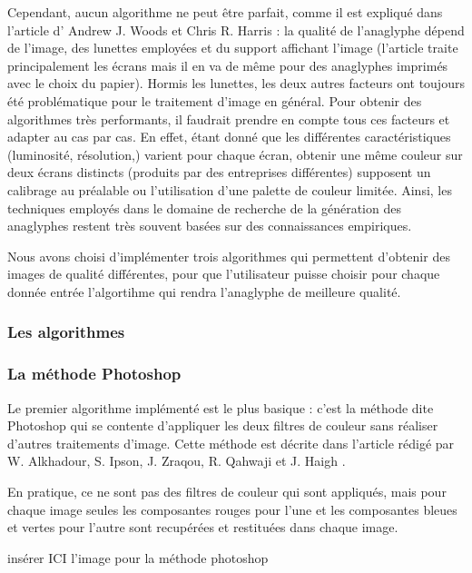 	Cependant, aucun algorithme ne peut être parfait, comme il est expliqué dans l'article d' Andrew J. Woods et Chris R. Harris \cite{anaglypheDefaut}  : la qualité de l'anaglyphe dépend de l'image, des lunettes employées et du support affichant l'image (l'article traite principalement les écrans mais il en va de même pour des anaglyphes imprimés avec le choix du papier). Hormis les lunettes, les deux autres facteurs ont toujours été problématique pour le traitement d'image en général.  Pour obtenir des algorithmes très performants, il faudrait prendre en compte tous ces facteurs et adapter au cas par cas. En effet, étant donné que les différentes caractéristiques (luminosité, résolution,) varient pour chaque écran, obtenir une même couleur sur deux écrans distincts (produits par des entreprises différentes) supposent un calibrage au préalable ou l'utilisation d'une palette de couleur limitée. Ainsi, les techniques employés dans le domaine de recherche de la génération des anaglyphes restent très souvent basées sur des connaissances empiriques.
		
	Nous avons choisi d'implémenter trois algorithmes qui permettent d'obtenir des images de qualité différentes, pour que l'utilisateur puisse choisir pour chaque donnée entrée l'algortihme qui rendra l'anaglyphe de meilleure qualité. %
	  
\subsubsection{Les algorithmes}

\subsubsection{La méthode Photoshop}
	Le premier algorithme implémenté est le plus basique : c'est la méthode dite Photoshop qui se contente d'appliquer les deux filtres de couleur sans réaliser d'autres traitements d'image. Cette méthode est décrite dans l'article rédigé par W. Alkhadour, S. Ipson, J. Zraqou, R. Qahwaji et J. Haigh \cite{steteroAnaglyph}.
		
	En pratique, ce ne sont pas des filtres de couleur qui sont appliqués, mais pour chaque image seules les composantes rouges pour l'une et les composantes bleues et vertes pour l'autre sont recupérées et restituées dans chaque image.
	
	 insérer ICI l'image pour la méthode photoshop

